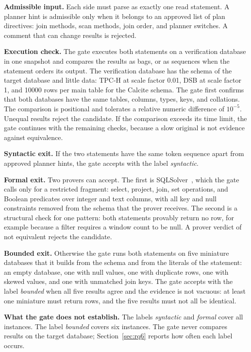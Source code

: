 \documentclass[conference]{IEEEtran}
\begin{document}
\textbf{Admissible input.}
Each side must parse as exactly one read statement.
A planner hint is admissible only when it belongs to an approved list of plan directives: join methods, scan methods, join order, and planner switches.
A comment that can change results is rejected.

\textbf{Execution check.}
The gate executes both statements on a verification database in one snapshot and compares the results as bags, or as sequences when the statement orders its output.
The verification database has the schema of the target database and little data: TPC-H at scale factor 0.01, DSB at scale factor 1, and \num{10000} rows per main table for the Calcite schema.
The gate first confirms that both databases have the same tables, columns, types, keys, and collations.
The comparison is positional and tolerates a relative numeric difference of $10^{-5}$.
Unequal results reject the candidate.
If the comparison exceeds its time limit, the gate continues with the remaining checks, because a slow original is not evidence against equivalence.

\textbf{Syntactic exit.}
If the two statements have the same token sequence apart from approved planner hints, the gate accepts with the label \emph{syntactic}.

\textbf{Formal exit.}
Two provers can accept.
The first is SQLSolver~\cite{ding2023}, which the gate calls only for a restricted fragment: select, project, join, set operations, and Boolean predicates over integer and text columns, with all key and null constraints removed from the schema that the prover receives.
The second is a structural check for one pattern: both statements provably return no row, for example because a filter requires a window count to be null.
A prover verdict of not equivalent rejects the candidate.

\textbf{Bounded exit.}
Otherwise the gate runs both statements on five miniature databases that it builds from the schema and from the literals of the statement: an empty database, one with null values, one with duplicate rows, one with skewed values, and one with unmatched join keys.
The gate accepts with the label \emph{bounded} when all five results agree and the evidence is not vacuous: at least one miniature must return rows, and the five results must not all be identical.

\textbf{What the gate does not establish.}
The labels \emph{syntactic} and \emph{formal} cover all instances.
The label \emph{bounded} covers six instances.
The gate never compares results on the target database; Section~\ref{sec:rq6} reports how often each label occurs.
\end{document}
